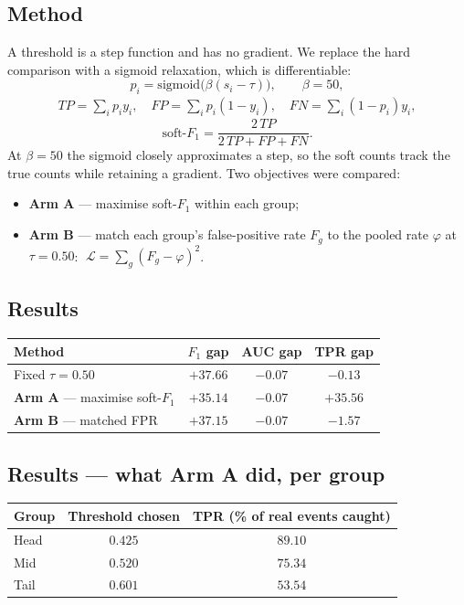 \documentclass[11pt,a4paper]{article}
\begin{document}
\subsection{Method}
A threshold is a step function and has no gradient. We replace the hard
comparison with a sigmoid relaxation, which is differentiable:
\begin{equation}
p_i = \mathrm{sigmoid}\big(\beta (s_i - \tau)\big), \qquad \beta = 50,
\end{equation}
\begin{align}
TP = \textstyle\sum_i p_i y_i, \quad
FP = \textstyle\sum_i p_i (1-y_i), \quad
FN = \textstyle\sum_i (1-p_i) y_i,
\end{align}
\begin{equation}
\text{soft-}F_1 = \frac{2\,TP}{2\,TP + FP + FN}.
\end{equation}
At $\beta = 50$ the sigmoid closely approximates a step, so the soft counts
track the true counts while retaining a gradient. Two objectives were compared:
\begin{itemize}\itemsep2pt
\item \textbf{Arm A} --- maximise soft-$F_1$ within each group;
\item \textbf{Arm B} --- match each group's false-positive rate $F_g$ to the
pooled rate $\varphi$ at $\tau = 0.50$: $\;\mathcal{L} = \sum_g (F_g - \varphi)^2$.
\end{itemize}

\subsection{Results}
\begin{center}
\begin{tabular}{lccc}
\toprule
Method & $F_1$ gap & AUC gap & \textbf{TPR gap} \\
\midrule
Fixed $\tau = 0.50$ & $+37.66$ & $-0.07$ & $-0.13$ \\
\textbf{Arm A} --- maximise soft-$F_1$ & $+35.14$ & $-0.07$ & $\mathbf{+35.56}$ \\
\textbf{Arm B} --- matched FPR & $+37.15$ & $-0.07$ & $-1.57$ \\
\bottomrule
\end{tabular}
\end{center}

\subsection{Results --- what Arm A did, per group}
\begin{center}
\begin{tabular}{lcc}
\toprule
Group & Threshold chosen & TPR (\% of real events caught) \\
\midrule
Head & $0.425$ & $89.10$ \\
Mid & $0.520$ & $75.34$ \\
Tail & $\mathbf{0.601}$ & $\mathbf{53.54}$ \\
\bottomrule
\end{tabular}
\end{center}
\end{document}
